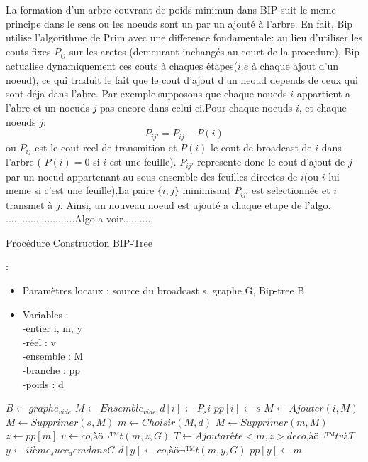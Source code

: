 La formation d'un arbre couvrant de poids minimun dans BIP suit le meme principe dans le sens ou les noeuds sont un par un ajouté à l'arbre.
En fait, Bip utilise l'algorithme de Prim avec une difference fondamentale: au lieu d'utiliser les couts fixes $P_{ij}$ sur les aretes (demeurant inchangés au court de la procedure),
Bip actualise dynamiquement ces couts à chaques étapes($i.e$ à chaque ajout d'un noeud), ce qui traduit le fait que le cout d'ajout d'un neoud depends de ceux qui sont déja dans l'abre.
Par exemple,supposons que chaque noueds $i$ appartient a l'abre et un noeuds $j$ pas encore dans celui ci.Pour chaque noeuds $i$, et chaque noeuds $j$:
$$P_{ij'}=P_{ij}-P(i)$$
ou $P_{ij}$ est le cout reel de transmition et $P(i)$ le cout de broadcast de $i$ dans l'arbre ( $P(i)=0$ si $i$ est une feuille). $P_{ij'}$ represente donc le cout d'ajout de $j$ par un noeud appartenant au sous ensemble des feuilles
 directes de $i$(ou $i$ lui meme si c'est une feuille).La paire $\{i,j\}$ minimisant $P_{ij'}$ est selectionnée et $i$ transmet à $j$. Ainsi, un nouveau noeud est ajouté a chaque etape de l'algo.\\

.........................Algo a voir...........

\begin{algorithm}[h]
\caption{Procédure Construction BIP-Tree}
\label{algo_LBIP_tree}
\begin{algorithmic}
\REQUIRE:
\begin{itemize}
 \item Paramètres locaux : source du broadcast s, graphe G, Bip-tree B
 \item  Variables : \\
  -entier i, m, y\\
  -réel : v\\
  -ensemble : M\\
  -branche : pp\\
  -poids : d \\
\end{itemize}


\STATE  $B \leftarrow graphe_{vide}$
\STATE  $M \leftarrow Ensemble_{vide}$
    \STATE $d[i] \leftarrow P_si$
    \STATE $pp[i] \leftarrow s$ 
    \STATE $M \leftarrow Ajouter (i,M)$
  \ENDFOR
  \STATE $M \leftarrow Supprimer (s,M)$
   \STATE $m \leftarrow Choisir (M,d)$
   \STATE $M \leftarrow Supprimer (m,M)$
   \STATE $z \leftarrow pp[m]$
   \STATE $v \leftarrow co‚àö¬™t (m,z,G)$
   \STATE $T \leftarrow Ajout arête <m,z> de co‚àö¬™t v à T$
     \STATE $y \leftarrow i ième_succ_de m dans G$
       \STATE $d[y] \leftarrow co‚àö¬™t(m,y,G)$
       \STATE $pp[y] \leftarrow m$
     \ENDIF
    \ENDFOR
\ENDWHILE


\end{algorithmic}
\end{algorithm}

